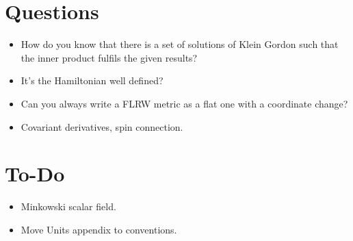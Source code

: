 \section{Questions}
\begin{itemize}
	\item How do you know that there is a set of solutions of Klein Gordon such that the inner product fulfils the given results?
	\item It's the Hamiltonian well defined?
	\item Can you always write a FLRW metric as a flat one with a coordinate change?
	\item Covariant derivatives, spin connection.
\end{itemize}
\section{To-Do}
\begin{itemize}
	\item Minkowski scalar field.
	\item Move Units appendix to conventions.
\end{itemize}